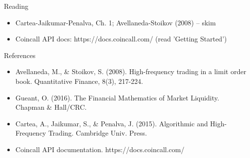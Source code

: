 \documentclass[aspectratio=169,10pt]{beamer}
\begin{document}
\begin{frame}{Reading}
\begin{itemize}
  \item Cartea-Jaikumar-Penalva, Ch. 1; Avellaneda-Stoikov (2008) -- skim
  \item Coincall API docs: https://docs.coincall.com/  (read 'Getting Started')
\end{itemize}
\end{frame}

\begin{frame}{References}
\scriptsize\begin{itemize}\setlength{\itemsep}{3pt}
  \item Avellaneda, M., \& Stoikov, S. (2008). High-frequency trading in a limit order book. Quantitative Finance, 8(3), 217-224.
  \item Gueant, O. (2016). The Financial Mathematics of Market Liquidity. Chapman \& Hall/CRC.
  \item Cartea, A., Jaikumar, S., \& Penalva, J. (2015). Algorithmic and High-Frequency Trading. Cambridge Univ. Press.
  \item Coincall API documentation. https://docs.coincall.com/
\end{itemize}
\end{frame}
\end{document}
